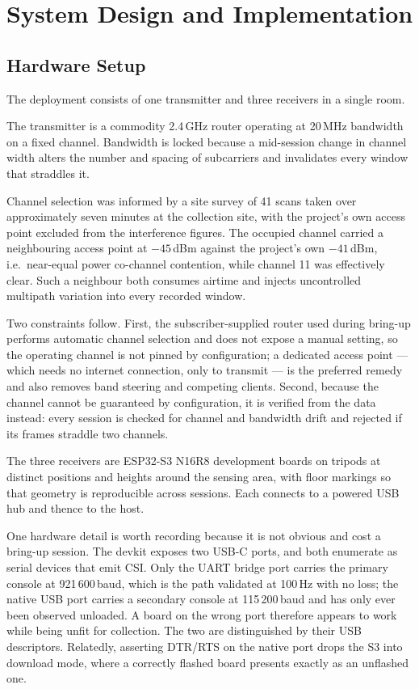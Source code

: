 \chapter{System Design and Implementation}
\label{ch:system}

\section{Hardware Setup}

The deployment consists of one transmitter and three receivers in a single
room.

The transmitter is a commodity 2.4\,GHz router operating at 20\,MHz
bandwidth on a fixed channel. Bandwidth is locked because a mid-session
change in channel width alters the number and spacing of subcarriers and
invalidates every window that straddles it.

Channel selection was informed by a site survey of 41 scans taken over
approximately seven minutes at the collection site, with the project's own
access point excluded from the interference figures. The occupied channel
carried a neighbouring access point at $-45$\,dBm against the project's own
$-41$\,dBm, i.e.\ near-equal power co-channel contention, while channel 11
was effectively clear. Such a neighbour both consumes airtime and injects
uncontrolled multipath variation into every recorded window.

Two constraints follow. First, the subscriber-supplied router used during
bring-up performs automatic channel selection and does not expose a manual
setting, so the operating channel is not pinned by configuration; a dedicated
access point --- which needs no internet connection, only to transmit --- is
the preferred remedy and also removes band steering and competing clients.
Second, because the channel cannot be guaranteed by configuration, it is
verified from the data instead: every session is checked for channel and
bandwidth drift and rejected if its frames straddle two channels.

The three receivers are ESP32-S3 N16R8 development boards on tripods at
distinct positions and heights around the sensing area, with floor markings
so that geometry is reproducible across sessions. Each connects to a powered
USB hub and thence to the host.

One hardware detail is worth recording because it is not obvious and cost a
bring-up session. The devkit exposes two USB-C ports, and both enumerate as
serial devices that emit CSI. Only the UART bridge port carries the primary
console at 921\,600\,baud, which is the path validated at 100\,Hz with no
loss; the native USB port carries a secondary console at 115\,200\,baud and
has only ever been observed unloaded. A board on the wrong port therefore
appears to work while being unfit for collection. The two are distinguished
by their USB descriptors. Relatedly, asserting DTR/RTS on the native port
drops the S3 into download mode, where a correctly flashed board presents
exactly as an unflashed one.

